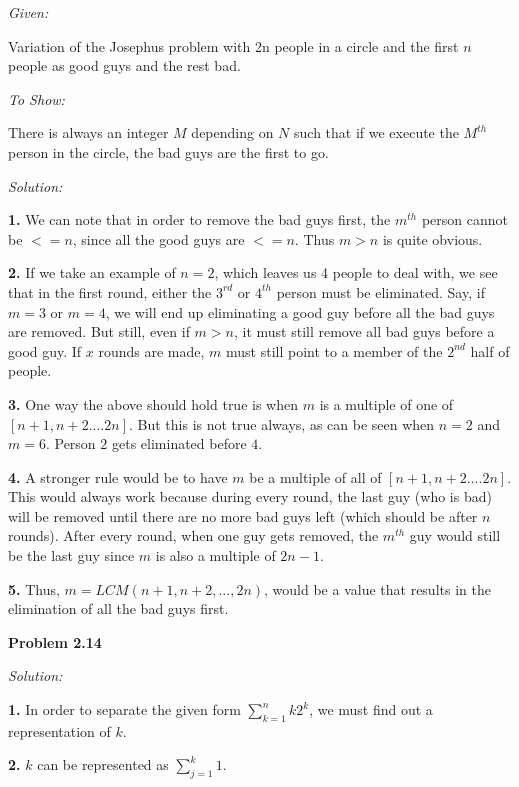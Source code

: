 \documentclass[12pt]{article}
\begin{document}
\textit {Given:}

Variation of the Josephus problem with 2n people in a circle and the first $n$ people as good guys and the rest bad.

\medskip
\textit {To Show:}

There is always an integer $M$ depending on $N$ such that if we execute the $M^{th}$ person in the circle, the bad guys are the first to go.

\medskip

\textit {Solution:}
\medskip

{\bf 1.} We can note that in order to remove the bad guys first, the $m^{th}$ person cannot be $<= n$, since all the good guys are $<=n$. Thus $m>n$ is quite obvious.

{\bf 2.} If we take an example of $n=2$, which leaves us 4 people to deal with, we see that in the first round, either the $3^{rd}$ or $4^{th}$ person must be eliminated. Say, if $m = 3$ or $m = 4$, we will end up eliminating a good guy before all the bad guys are removed. But still, even if $m>n$, it must still remove all bad guys before a good guy. If $x$ rounds are made, $m$ must still point to a member of the $2^{nd}$ half of people.

{\bf 3.} One way the above should hold true is when $m$ is a multiple of one of $[n+1, n+2....2n]$. But this is not true always, as can be seen when $n=2$ and $m=6$. Person $2$ gets eliminated before $4$.

{\bf 4.} A stronger rule would be to have $m$ be a multiple of all of $[n+1, n+2....2n]$. This would always work because during every round, the last guy (who is bad) will be removed until there are no more bad guys left (which should be after $n$ rounds). After every round, when one guy gets removed, the $m^{th}$ guy would still be the last guy since $m$ is also a multiple of $2n-1$.

{\bf 5.} Thus, $m=LCM(n+1, n+2, ... , 2n)$, would be a value that results in the elimination of all the bad guys first.


\noindent
{\bf Problem 2.14}

\textit {Solution:}

{\bf 1.} In order to separate the given form $\sum_{k=1}^{n} k2^k$, we must find out a representation of $k$.

{\bf 2.} $k$ can be represented as $\sum_{j=1}^{k} 1$.
\end{document}
